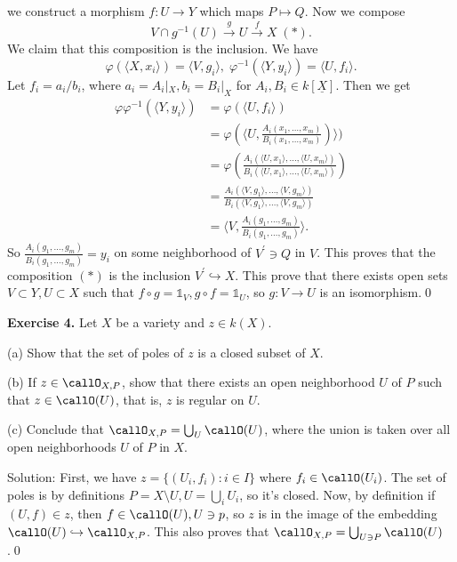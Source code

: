 we construct a morphism $f: U\to Y$ which maps $P\mapsto Q$. Now we compose 
\begin{equation}
    V\cap g^{-1}(U) \overset{g}{\rightarrow} U \overset{f}{\rightarrow} X\;(*).
\end{equation}
We claim that this composition is the inclusion. We have 
\begin{equation}
    \varphi(\langle X,x_i\rangle) = \langle V, g_i\rangle,\; 
    \varphi^{-1}(\langle Y, y_i\rangle) = \langle U, f_i\rangle.
\end{equation}
Let $f_i = a_i/b_i$, where $a_i=A_i|_X,b_i = B_i|_X$ for $A_i,B_i\in k[\underline{X}]$. Then we get 
\begin{equation}
    \begin{split}
         \varphi\varphi^{-1}(\langle Y, y_i\rangle) &= \varphi(\langle U, f_i\rangle)\\
         &=\varphi(\langle U,\frac{ A_i(x_1,\dots, x_m)}{B_i(x_1,\dots, x_m)})\rangle)\\
         &=\varphi(\frac{ A_i(\langle U,x_1\rangle,\dots, \langle U,x_m\rangle)}
         {B_i(\langle U,x_1\rangle,\dots,\langle U, x_m\rangle)} )\\
         &=\frac{ A_i(\langle V,g_1\rangle,\dots, \langle V,g_m\rangle)}
         {B_i(\langle V,g_1\rangle,\dots,\langle V, g_m\rangle)} \\
         &=\langle V,\frac{ A_i(g_1,\dots, g_m)}{B_i(g_1,\dots, g_m)}\rangle.
    \end{split}
\end{equation}
So $\frac{ A_i(g_1,\dots, g_m)}{B_i(g_1,\dots, g_m)} = y_i$ on some neighborhood of $V^\prime\ni Q$ in $V$. This proves that 
the composition $(*)$ is the inclusion $V^\prime\hookrightarrow X$. This prove that there exists open sets 
$V\subset Y,U\subset X$ such that $f\circ g = \mathds{1}_V, g\circ f=\mathds{1}_U$, so $g:V\to U$ is an isomorphism.\qed



\begin{dang}
    \textbf{Exercise 4.}
    Let $X$ be a variety and $z \in k(X)$.

(a) Show that the set of poles of $z$ is a closed subset of $X$.

(b) If $z \in \callO_{X,P}$, show that there exists an open neighborhood $U$ of $P$ such 
that $z \in \callO(U)$, that is, $z$ is regular on $U$.

(c) Conclude that $\callO_{X,P} = \bigcup_U \callO(U)$, where the union is taken over all open neighborhoods $U$ of $P$ in $X$.
\end{dang}
Solution: First, we have $z=\{(U_i, f_i):i\in I\}$ where $f_i\in\callO(U_i)$. The set of poles 
is by definitions $P=X\setminus U, U=\bigcup_i U_i$, so it's closed. Now, by definition 
if $(U,f)\in z$, then $f\in\callO(U),U\ni p$, so $z$ is in the image of the embedding 
$\callO(U)\hookrightarrow \callO_{X,P}$. This also proves that $\callO_{X,P}=\bigcup_{U\ni P}\callO(U)$.\qed

